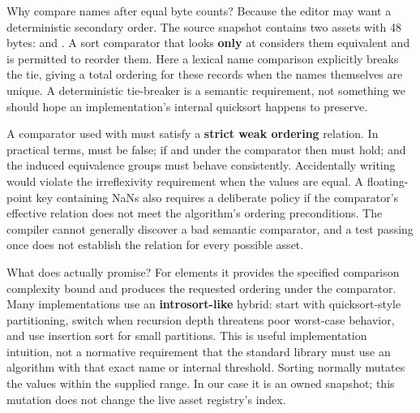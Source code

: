 Why compare names after equal byte counts? Because the editor may want a deterministic secondary order. The source snapshot contains two assets with 48 bytes:  and . A sort comparator that looks \textbf{only} at  considers them equivalent and is permitted to reorder them. Here a lexical name comparison explicitly breaks the tie, giving a total ordering for these records when the names themselves are unique. A deterministic tie-breaker is a semantic requirement, not something we should hope an implementation's internal quicksort happens to preserve.

A comparator used with  must satisfy a \textbf{strict weak ordering} relation. In practical terms,  must be false; if  and  under the comparator then  must hold; and the induced equivalence groups must behave consistently. Accidentally writing  would violate the irreflexivity requirement when the values are equal. A floating-point key containing NaNs also requires a deliberate policy if the comparator's effective relation does not meet the algorithm's ordering preconditions. The compiler cannot generally discover a bad semantic comparator, and a test passing once does not establish the relation for every possible asset.

What does  actually promise? For  elements it provides the specified comparison complexity bound and produces the requested ordering under the comparator. Many implementations use an \textbf{introsort-like} hybrid: start with quicksort-style partitioning, switch when recursion depth threatens poor worst-case behavior, and use insertion sort for small partitions. This is useful implementation intuition, not a normative requirement that the standard library must use an algorithm with that exact name or internal threshold. Sorting normally mutates the values within the supplied range. In our case it is an owned snapshot; this mutation does not change the live asset registry's index.

